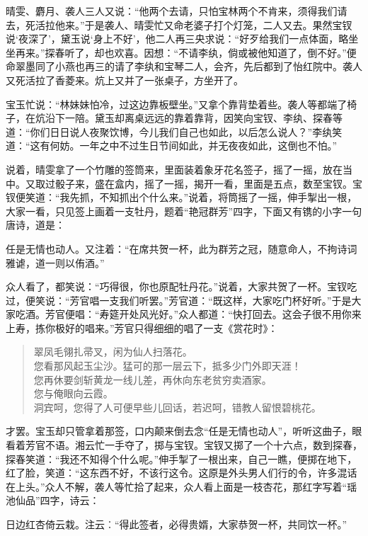 \documentclass[12pt,oneside]{book}
\newenvironment{shici}{%
\begin{verse}%
\centering\large\hspace{12pt}}%
{\end{verse}}
\begin{document}
晴雯、麝月、袭人三人又说：“他两个去请，只怕宝林两个不肯来，须得我们请去，死活拉他来。”于是袭人、晴雯忙又命老婆子打个灯笼，二人又去。果然宝钗说‘夜深了’，黛玉说‘身上不好’，他二人再三央求说：“好歹给我们一点体面，略坐坐再来。”探春听了，却也欢喜。因想：“不请李纨，倘或被他知道了，倒不好。”便命翠墨同了小燕也再三的请了李纨和宝琴二人，会齐，先后都到了怡红院中。袭人又死活拉了香菱来。炕上又并了一张桌子，方坐开了。

宝玉忙说：“林妹妹怕冷，过这边靠板壁坐。”又拿个靠背垫着些。袭人等都端了椅子，在炕沿下一陪。黛玉却离桌远远的靠着靠背，因笑向宝钗、李纨、探春等道：“你们日日说人夜聚饮博，今儿我们自己也如此，以后怎么说人？”李纨笑道：“这有何妨。一年之中不过生日节间如此，并无夜夜如此，这倒也不怕。”

说着，晴雯拿了一个竹雕的签筒来，里面装着象牙花名签子，摇了一摇，放在当中。又取过骰子来，盛在盒内，摇了一摇，揭开一看，里面是五点，数至宝钗。宝钗便笑道：“我先抓，不知抓出个什么来。”说着，将筒摇了一摇，伸手掣出一根，大家一看，只见签上画着一支牡丹，题着“艳冠群芳”四字，下面又有镌的小字一句唐诗，道是：

任是无情也动人。又注着：“在席共贺一杯，此为群芳之冠，随意命人，不拘诗词雅谑，道一则以侑酒。”

众人看了，都笑说：“巧得很，你也原配牡丹花。”说着，大家共贺了一杯。宝钗吃过，便笑说：“芳官唱一支我们听罢。”芳官道：“既这样，大家吃门杯好听。”于是大家吃酒。芳官便唱：“寿筵开处风光好。”众人都道：“快打回去。这会子很不用你来上寿，拣你极好的唱来。”芳官只得细细的唱了一支《赏花时》：

\begin{shici}
翠凤毛翎扎帚叉，闲为仙人扫落花。\\
您看那风起玉尘沙。猛可的那一层云下，抵多少门外即天涯！\\
您再休要剑斩黄龙一线儿差，再休向东老贫穷卖酒家。\\
您与俺眼向云霞。\\
洞宾呵，您得了人可便早些儿回话，若迟呵，错教人留恨碧桃花。
\end{shici}


才罢。宝玉却只管拿着那签，口内颠来倒去念“任是无情也动人”，听听这曲子，眼看着芳官不语。湘云忙一手夺了，掷与宝钗。宝钗又掷了一个十六点，数到探春，探春笑道：“我还不知得个什么呢。”伸手掣了一根出来，自己一瞧，便掷在地下，红了脸，笑道：“这东西不好，不该行这令。这原是外头男人们行的令，许多混话在上头。”众人不解，袭人等忙拾了起来，众人看上面是一枝杏花，那红字写着“瑶池仙品”四字，诗云：

日边红杏倚云栽。注云︰“得此签者，必得贵婿，大家恭贺一杯，共同饮一杯。”
\end{document}
